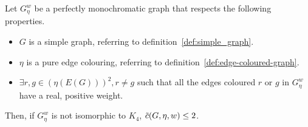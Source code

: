 \begin{lemma}
    \label{lem:2_positive_colour_classes_forbidden}
    Let $G_\eta^w$ be a perfectly monochromatic graph that respects the following properties.
    \begin{itemize}
        \item $G$ is a simple graph, referring to definition~\ref{def:simple_graph}.
        \item $\eta$ is a pure edge colouring, referring to definition~\ref{def:edge-coloured-graph}.
        \item $\exists r, g \in \left(\eta(E(G))\right)^2, r \neq g$ such that all the edges coloured $r$ or $g$ in $G_\eta^w$ have a real, positive weight.
    \end{itemize}
    Then, if $G_\eta^w$ is not isomorphic to $K_4$, $\Tilde{c}(G, \eta, w) \leq 2$.
\end{lemma}

